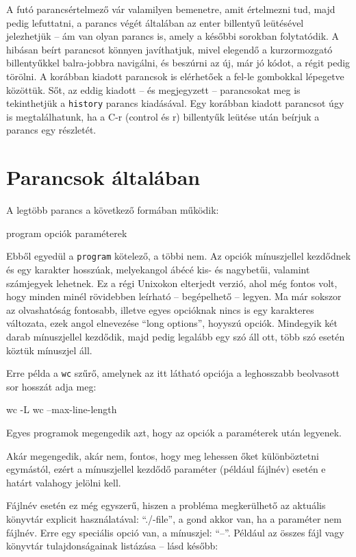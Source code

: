 A futó parancsértelmező vár valamilyen bemenetre, amit értelmezni tud, majd
pedig lefuttatni, a parancs végét általában az enter billentyű leütésével
jelezhetjük -- ám van olyan parancs is, amely a későbbi sorokban folytatódik.
A hibásan beírt parancsot könnyen
javíthatjuk, mivel elegendő a kurzormozgató billentyűkkel balra-jobbra
navigálni, és beszúrni az új, már jó kódot, a régit pedig törölni. A korábban
kiadott parancsok is elérhetőek a fel-le gombokkal lépegetve közöttük. Sőt, az
eddig kiadott -- és megjegyzett -- parancsokat meg is tekinthetjük a
\texttt{history} parancs kiadásával. Egy korábban kiadott parancsot úgy is
megtalálhatunk, ha a C-r (control és r) billentyűk leütése után beírjuk a
parancs egy részletét.

\section{Parancsok általában}

A legtöbb parancs a következő formában működik:

\begin{VerbExample}
program opciók paraméterek
\end{VerbExample}

Ebből egyedül a \texttt{program} kötelező, a többi nem. Az opciók mínuszjellel
kezdődnek és egy karakter hosszúak, melyekangol ábécé kis- és nagybetűi, valamint
számjegyek lehetnek. Ez a régi Unixokon elterjedt verzió, ahol még fontos volt,
hogy minden minél rövidebben leírható -- begépelhető -- legyen. Ma már sokszor
az olvashatóság fontosabb, illetve egyes opcióknak nincs is egy karakteres
változata, ezek angol elnevezése ``long options'', hoyyszú opciók. Mindegyik két
darab mínuszjellel kezdődik, majd pedig legalább egy szó áll ott, több szó
esetén köztük mínuszjel áll. 

Erre példa a \texttt{wc} szűrő, amelynek az itt látható opciója a leghosszabb
beolvasott sor hosszát adja meg:

\begin{VerbExample}
wc -L
wc --max-line-length
\end{VerbExample} 

Egyes programok megengedik azt, hogy az opciók a paraméterek után legyenek.

Akár megengedik, akár nem, fontos, hogy meg lehessen őket különböztetni
egymástól, ezért a mínuszjellel kezdődő paraméter (például fájlnév) esetén e
határt valahogy jelölni kell.

Fájlnév esetén ez még egyszerű, hiszen a probléma megkerülhető az aktuális
könyvtár explicit használatával: ``./-file'', a gond akkor van, ha a paraméter
nem fájlnév. Erre egy speciális opció van, a mínuszjel: ``--''. Például az
összes fájl vagy könyvtár tulajdonságainak listázása -- lásd később:

